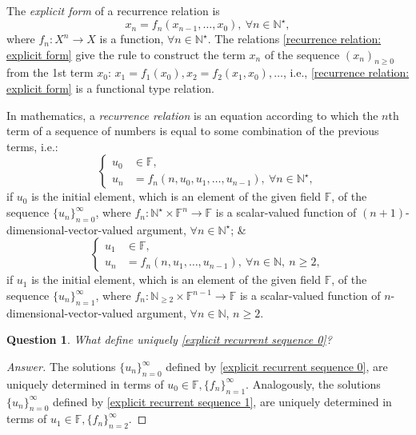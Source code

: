 \documentclass{article}
\newtheorem{question}{Question}
\begin{document}
The {\it explicit form} of a recurrence relation is
\begin{equation}
	\label{recurrence relation: explicit form}
	x_n = f_n(x_{n-1},\ldots,x_0),\ \forall n\in\mathbb{N}^\star,
\end{equation}
where $f_n:X^n\to X$ is a function, $\forall n\in\mathbb{N}^\star$. The relations \eqref{recurrence relation: explicit form} give the rule to construct the term $x_n$ of the sequence $(x_n)_{n\ge0}$ from the 1st term $x_0$: $x_1 = f_1(x_0),x_2 = f_2(x_1,x_0),\ldots$, i.e., \eqref{recurrence relation: explicit form} is a functional type relation.

In mathematics, a {\it recurrence relation} is an equation according to which the $n$th term of a sequence of numbers is equal to some combination of the previous terms, i.e.:
\begin{equation}
	\label{explicit recurrent sequence 0}
	\left\{\begin{split}
		u_0&\in\mathbb{F},\\
		u_n &= f_n(n,u_0,u_1,\ldots,u_{n-1}),\ \forall n\in\mathbb{N}^\star,
	\end{split}\right.
\end{equation}
if $u_0$ is the initial element, which is an element of the given field $\mathbb{F}$, of the sequence $\{u_n\}_{n=0}^\infty$, where $f_n:\mathbb{N}^\star\times\mathbb{F}^n\to\mathbb{F}$ is a scalar-valued function of $(n + 1)$-dimensional-vector-valued argument, $\forall n\in\mathbb{N}^\star$; \&
\begin{equation}
	\label{explicit recurrent sequence 1}
	\left\{\begin{split}
		u_1&\in\mathbb{F},\\
		u_n &= f_n(n,u_1,\ldots,u_{n-1}),\ \forall n\in\mathbb{N},\ n\ge2,
	\end{split}\right.
\end{equation}
if $u_1$ is the initial element, which is an element of the given field $\mathbb{F}$, of the sequence $\{u_n\}_{n=1}^\infty$, where $f_n:\mathbb{N}_{\ge2}\times\mathbb{F}^{n-1}\to\mathbb{F}$ is a scalar-valued function of $n$-dimensional-vector-valued argument, $\forall n\in\mathbb{N}$, $n\ge2$.

\begin{question}
	What define uniquely \eqref{explicit recurrent sequence 0}?
\end{question}

\begin{proof}[Answer]
	The solutions $\{u_n\}_{n=0}^\infty$ defined by \eqref{explicit recurrent sequence 0}, are uniquely determined in terms of $u_0\in\mathbb{F},\{f_n\}_{n=1}^\infty$. Analogously, the solutions $\{u_n\}_{n=0}^\infty$ defined by \eqref{explicit recurrent sequence 1}, are uniquely determined in terms of $u_1\in\mathbb{F},\{f_n\}_{n=2}^\infty$.
\end{proof}
\end{document}

